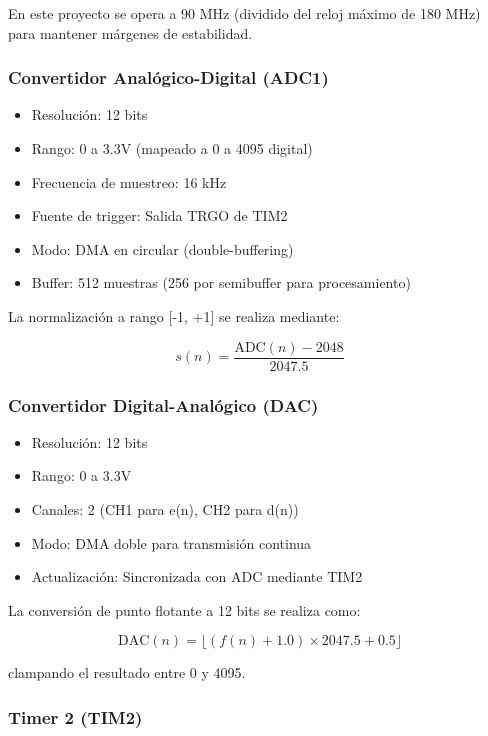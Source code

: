 \documentclass[12pt]{article}
\begin{document}
				En este proyecto se opera a 90 MHz (dividido del reloj máximo de 180 MHz) para mantener márgenes de estabilidad.

			\subsubsection{Convertidor Analógico-Digital (ADC1)}

				\begin{itemize}
					\item Resolución: 12 bits
					\item Rango: 0 a 3.3V (mapeado a 0 a 4095 digital)
					\item Frecuencia de muestreo: 16 kHz
					\item Fuente de trigger: Salida TRGO de TIM2
					\item Modo: DMA en circular (double-buffering)
					\item Buffer: 512 muestras (256 por semibuffer para procesamiento)
				\end{itemize}

				La normalización a rango [-1, +1] se realiza mediante:

				\[
				s(n) = \frac{\text{ADC}(n) - 2048}{2047.5}
				\]

			\subsubsection{Convertidor Digital-Analógico (DAC)}

				\begin{itemize}
					\item Resolución: 12 bits
					\item Rango: 0 a 3.3V
					\item Canales: 2 (CH1 para e(n), CH2 para d(n))
					\item Modo: DMA doble para transmisión continua
					\item Actualización: Sincronizada con ADC mediante TIM2
				\end{itemize}

				La conversión de punto flotante a 12 bits se realiza como:

				\[
				\text{DAC}(n) = \lfloor (f(n) + 1.0) \times 2047.5 + 0.5 \rfloor
				\]

				clampando el resultado entre 0 y 4095.

			\subsubsection{Timer 2 (TIM2)}
\end{document}
